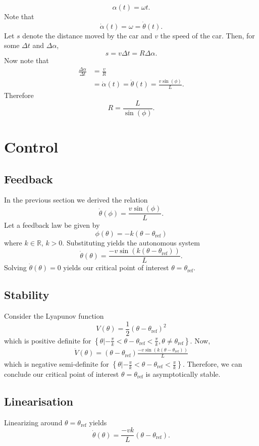 \documentclass[11pt,titlepage]{report}
\begin{document}
\[
	\alpha(t) = \omega t.
\]
Note that
\[
	\dot{\alpha}(t) = \omega = \dot{\theta}(t).
\]
Let $s$ denote the distance moved by the car and $v$ the speed of the car. Then, for some $\Delta t$ and $\Delta \alpha$,
\[
	s = v \Delta t = R \Delta \alpha.
\]
Now note that
\begin{align*}
	\frac{\Delta \alpha}{\Delta t} &= \frac{v}{R} \\
	&=\dot{\alpha}(t)=\dot{\theta}(t) = \frac{v \sin{(\phi)}}{L}.
\end{align*}
Therefore
\begin{equation} \label{eq:steering-radius}
	R = \frac{L}{\sin{(\phi)}}.
\end{equation}

\section*{Control}
\subsection*{Feedback}
In the previous section we derived the relation
\[
	\dot{\theta}(\phi) = \frac{v \sin{(\phi)}}{L}.
\]
Let a feedback law be given by
\[
	\phi(\theta) = -k(\theta-\theta_{\text{ref}})
\]
where $k \in \mathbb{R}$, $k > 0$. Substituting yields the autonomous system
\[
	\dot{\theta}(\theta) = \frac{- v \sin{(k (\theta-\theta_{\text{ref}}))}}{L}.
\]
Solving $\dot{\theta}(\theta)=0$ yields our critical point of interest $\theta=\theta_{\text{ref}}$.

\subsection*{Stability}
Consider the Lyapunov function
\[
	V(\theta) = \frac{1}{2}(\theta-\theta_{\text{ref}})^2
\]
which is positive definite for $\left\{\theta | -\frac{\pi}{k} < \theta-\theta_{\text{ref}} < \frac{\pi}{k}, \theta \neq \theta_{\text{ref}} \right\}$. Now,
\begin{align*}
	\dot{V}(\theta) = (\theta-\theta_{\text{ref}}) \frac{- v \sin{(k ({\theta-\theta_{\text{ref}}}))}}{L}
\end{align*}
which is negative semi-definite for $\left\{\theta | -\frac{\pi}{k} < \theta-\theta_{\text{ref}} < \frac{\pi}{k}\right\}$. Therefore, we can conclude our critical point of interest $\theta=\theta_{\text{ref}}$ is asymptotically stable.

\subsection*{Linearisation}
Linearizing around $\theta=\theta_{\text{ref}}$ yields
\[
	\dot{\theta}(\theta) = \frac{- v k}{L} (\theta-\theta_{\text{ref}}).
\]
\end{document}
